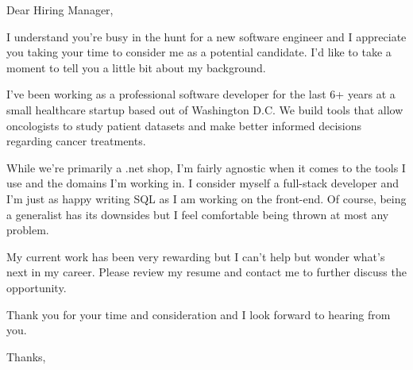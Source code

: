 \documentclass{letter}
\begin{document}
\begin{letter} {}
\opening{Dear Hiring Manager,}
 
I understand you're busy in the hunt for a new software engineer and I appreciate you taking your time to consider me as a potential candidate. I'd like to take a moment to tell you a little bit about my background. 
	
I've been working as a professional software developer for the last 6+ years at a small healthcare startup based out of Washington D.C. We build tools that allow oncologists to study patient datasets and make better informed decisions regarding cancer treatments.

While we're primarily a .net shop, I'm fairly agnostic when it comes to the tools I use and the domains I'm working in. I consider myself a full-stack developer and I'm just as happy writing SQL as I am working on the front-end. Of course, being a generalist has its downsides but I feel comfortable being thrown at most any problem.

My current work has been very rewarding but I can't help but wonder what's next in my career. Please review my resume and contact me to further discuss the opportunity.
 
Thank you for your time and consideration and I look forward to hearing from you.
 
\closing{Thanks,}

\end{letter}
 
\end{document}
